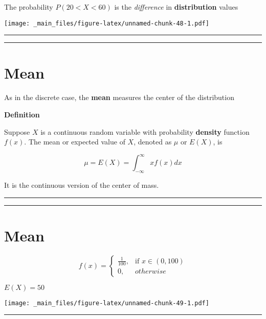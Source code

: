 \documentclass[
]{book}
\begin{document}
The probability \(P(20<X<60)\) is the \emph{difference} in \textbf{distribution} values

\texttt{[image: \_main\_files/figure-latex/unnamed-chunk-48-1.pdf]}

\begin{center}\rule{0.5\linewidth}{0.5pt}\end{center}

\begin{center}\rule{0.5\linewidth}{0.5pt}\end{center}

\hypertarget{mean-1}{%
\section{Mean}\label{mean-1}}

As in the discrete case, the \textbf{mean} measures the center of the distribution

\textbf{Definition}

Suppose \(X\) is a continuous random variable with probability \textbf{density} function \(f(x)\). The mean or expected value of \(X\), denoted as \(\mu\) or \(E(X)\), is

\[\mu=E(X)=\int_{-\infty}^\infty x f(x) dx\]

It is the continuous version of the center of mass.

\begin{center}\rule{0.5\linewidth}{0.5pt}\end{center}

\begin{center}\rule{0.5\linewidth}{0.5pt}\end{center}

\hypertarget{mean-2}{%
\section{Mean}\label{mean-2}}

\[
    f(x)= 
\begin{cases}
    \frac{1}{100},& \text{if } x\in (0,100)\\
    0,& otherwise 
\end{cases}
\]

\(E(X)=50\)

\texttt{[image: \_main\_files/figure-latex/unnamed-chunk-49-1.pdf]}

\begin{center}\rule{0.5\linewidth}{0.5pt}\end{center}
\end{document}
